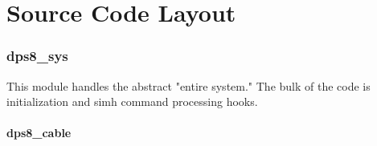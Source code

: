 \documentclass[notitlepage]{report}
\begin{document}


\part{Source Code Layout}

\section{dps8\_sys} 

This module handles the abstract "entire system." The bulk of the code is 
initialization and simh command processing hooks.

\subsection{dps8\_cable}
\end{document}
